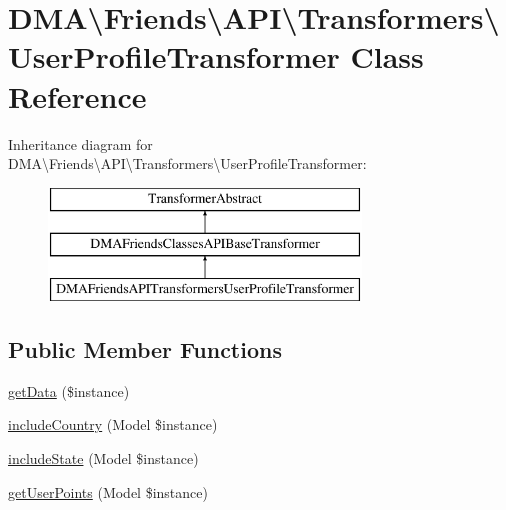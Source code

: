 \hypertarget{classDMA_1_1Friends_1_1API_1_1Transformers_1_1UserProfileTransformer}{}\section{D\+M\+A\textbackslash{}Friends\textbackslash{}A\+P\+I\textbackslash{}Transformers\textbackslash{}User\+Profile\+Transformer Class Reference}
\label{classDMA_1_1Friends_1_1API_1_1Transformers_1_1UserProfileTransformer}
Inheritance diagram for D\+M\+A\textbackslash{}Friends\textbackslash{}A\+P\+I\textbackslash{}Transformers\textbackslash{}User\+Profile\+Transformer\+:\begin{figure}[H]
\begin{center}
\leavevmode
\includegraphics[height=3.000000cm]{d6/d08/classDMA_1_1Friends_1_1API_1_1Transformers_1_1UserProfileTransformer}
\end{center}
\end{figure}
\subsection*{Public Member Functions}
\begin{DoxyCompactItemize}
\item 
\hyperlink{classDMA_1_1Friends_1_1API_1_1Transformers_1_1UserProfileTransformer_ada552f9a08e428c52c044ca8e7abc915}{get\+Data} (\$instance)
\item 
\hyperlink{classDMA_1_1Friends_1_1API_1_1Transformers_1_1UserProfileTransformer_aaea113bbd8cf8bd53b6ef3530d3fc07a}{include\+Country} (Model \$instance)
\item 
\hyperlink{classDMA_1_1Friends_1_1API_1_1Transformers_1_1UserProfileTransformer_accd7c7ec420193cbaa6077b26aa8d292}{include\+State} (Model \$instance)
\item 
\hyperlink{classDMA_1_1Friends_1_1API_1_1Transformers_1_1UserProfileTransformer_a8e0d4c0e3e2f424792f857292abb0710}{get\+User\+Points} (Model \$instance)
\end{DoxyCompactItemize}
